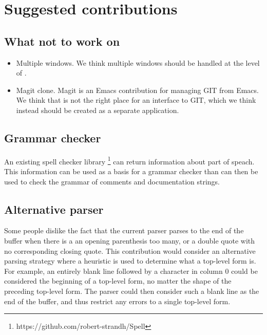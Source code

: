\chapter{Suggested contributions}

\section{What not to work on}

\begin{itemize}
\item Multiple windows.  We think multiple windows should be handled
  at the level of \mcclim{}.
\item Magit clone.  Magit is an Emacs contribution for managing GIT
  from Emacs.  We think that \sysname{} is not the right place for an
  interface to GIT, which we think instead should be created as a
  separate \clim{} application.
\end{itemize}

\section{Grammar checker}

An existing spell checker library%
\footnote{https://github.com/robert-strandh/Spell} can return
information about part of speach.  This information can be used as a
basis for a grammar checker than can then be used to check the grammar
of comments and documentation strings.

\section{Alternative \commonlisp{} parser}

Some people dislike the fact that the current parser parses to the end
of the buffer when there is a an opening parenthesis too many, or a
double quote with no corresponding closing quote.  This contribution
would consider an alternative parsing strategy where a heuristic is
used to determine what a top-level form is.  For example, an entirely
blank line followed by a character in column $0$ could be considered
the beginning of a top-level form, no matter the shape of the
preceding top-level form.  The parser could then consider such a blank
line as the end of the buffer, and thus restrict any errors to a
single top-level form.
